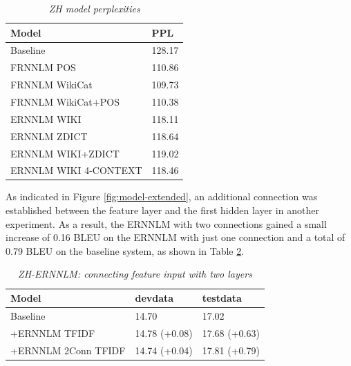 \documentclass[a4paper]{article}
\begin{document}
\begin{table}
  \caption{\it ZH model perplexities}
  \vspace{2mm}
  \centering
  \begin{tabular}{ ll}
  	\hline
  	Model                 & PPL    \\ \hline\hline
  	Baseline              & 128.17 \\ \hline
  	FRNNLM POS            & 110.86 \\
  	FRNNLM WikiCat        & 109.73 \\
  	FRNNLM WikiCat+POS    & 110.38 \\ \hline
  	ERNNLM WIKI           & 118.11 \\
  	ERNNLM ZDICT          & 118.64 \\
  	ERNNLM WIKI+ZDICT     & 119.02 \\
  	ERNNLM WIKI 4-CONTEXT & 118.46 \\ \hline
  \end{tabular}
  \label{tb:PPL}
\end{table}


As indicated in Figure \ref{fig:model-extended}, an additional connection was established between the feature layer and the first hidden layer in another experiment. As a result, the ERNNLM with two connections gained a small increase of 0.16 BLEU on the ERNNLM with just one connection and a total of 0.79 BLEU on the baseline system, as shown in Table \ref{tb:zh-extended-both}.


\begin{table}
\caption{\it ZH-ERNNLM: connecting feature input with two layers}
\vspace{2mm}
\centering
  \begin{tabular}{lll}
  	\hline
  	Model              & devdata       & testdata      \\ \hline\hline
  	Baseline           & 14.70         & 17.02         \\ \hline
  	+ERNNLM TFIDF      & 14.78 (+0.08) & 17.68 (+0.63) \\
  	+ERNNLM 2Conn TFIDF & 14.74 (+0.04) & 17.81 (+0.79)
  \end{tabular}
  \label{tb:zh-extended-both}
\end{table}
\end{document}
